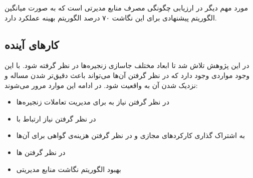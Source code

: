 مورد مهم دیگر در ارزیابی چگونگی مصرف منابع مدیرتی است که به صورت میانگین
الگوریتم پیشنهادی برای این نگاشت ۷۰ درصد الگوریتم بهینه عملکرد دارد.

\subsection{کارهای آینده}

در این پژوهش تلاش شد تا ابعاد مختلف جاسازی زنجیره‌ها در نظر گرفته شود.
با این وجود مواردی وجود دارد که در نظر گرفتن آن‌ها می‌تواند باعث دقیق‌تر شدن مساله
و نزدیک شدن آن به واقعیت شود.
در ادامه این موارد مرور می‌شوند:

\begin{itemize}
    \item در نظر گرفتن نیاز به  برای مدیریت تعاملات زنجیره‌ها
    \item در نظر گرفتن نیاز ارتباط  با 
    \item به اشتراک گذاری کارکردهای مجازی و در نظر گرفتن هزینه‌ی گواهی برای آن‌ها
    \item در نظر گرفتن ها
    \item بهبود الگوریتم نگاشت منابع مدیریتی
\end{itemize}